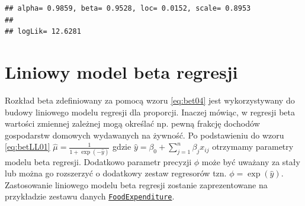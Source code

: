 \documentclass[polish,]{book}
\newenvironment{Shaded}{\begin{snugshade}}{\end{snugshade}}
\newcommand{\BuiltInTok}[1]{#1}
\newcommand{\CharTok}[1]{\textcolor[rgb]{0.31,0.60,0.02}{#1}}
\newcommand{\DecValTok}[1]{\textcolor[rgb]{0.00,0.00,0.81}{#1}}
\newcommand{\FloatTok}[1]{\textcolor[rgb]{0.00,0.00,0.81}{#1}}
\newcommand{\ImportTok}[1]{#1}
\newcommand{\NormalTok}[1]{#1}
\newcommand{\OperatorTok}[1]{\textcolor[rgb]{0.81,0.36,0.00}{\textbf{#1}}}
\newcommand{\SpecialCharTok}[1]{\textcolor[rgb]{0.00,0.00,0.00}{#1}}
\newcommand{\StringTok}[1]{\textcolor[rgb]{0.31,0.60,0.02}{#1}}
\begin{document}
\begin{Shaded}
\end{Shaded}

\begin{verbatim}
## alpha= 0.9859, beta= 0.9528, loc= 0.0152, scale= 0.8953
## 
## logLik= 12.6281
\end{verbatim}

\hypertarget{R42}{%
\section{Liniowy model beta regresji}\label{R42}}

Rozkład beta zdefiniowany za pomocą wzoru \eqref{eq:bet04} jest wykorzystywany do budowy liniowego modelu regresji dla proporcji. Inaczej mówiąc, w regresji beta wartości zmiennej zależnej mogą określać np. pewną frakcję dochodów gospodarstw domowych wydawanych na żywność.
Po podstawieniu do wzoru \eqref{eq:betLL01}
\(\hat{\mu}=\frac{1}{1+\exp(-\hat{y})}\) gdzie \(\hat{y}=\beta_0+\sum_{j=1}^{n}\beta_j x_{ij}\) otrzymamy parametry modelu beta regresji. Dodatkowo parametr precyzji \(\phi\) może być uważany za stały lub
można go rozszerzyć o dodatkowy zestaw regresorów tzn. \(\phi=\exp(\hat{y})\).
Zastosowanie liniowego modelu beta regresji zostanie zaprezentowane na przykładzie zestawu danych \href{https://rdrr.io/rforge/betareg/man/FoodExpenditure.html}{\texttt{FoodExpenditure}}.
\end{document}
